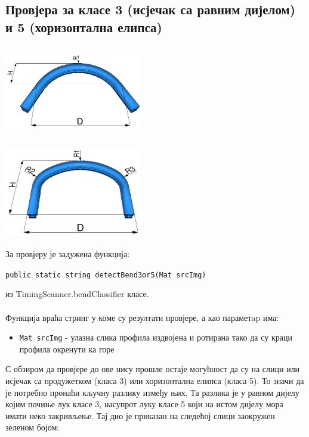 \documentclass[12pt]{article}
\begin{document}
\subsection{Провјера за класе 3 (исјечак са равним дијелом) и 5 (хоризонтална елипса)}
\vspace{0.5cm}
\begin{center}
    \centering 
    \includegraphics[height=4cm, width=6cm]{images/klasa3.jpg}
\end{center}
\vspace{0.5cm}
\vspace{0.5cm}
\begin{center}
    \centering 
    \includegraphics[height=4cm, width=6cm]{images/klasa5.jpg}
\end{center}
\vspace{0.5cm}
За провјеру је задужена функција:
\begin{center}
\texttt{public static string detectBend3or5(Mat srcImg)}
\end{center}
из TimingScanner.bendClassifier класе.\\\\
Функција враћа стринг у коме су резултати провјере, а као параметap има:
\begin{itemize}
    \item \texttt{Mat srcImg} - улазна слика профила издвојена и ротирана тако да су краци профила окренути ка горе 
\end{itemize}
С обзиром да провјере до ове нису прошле остаје могућност да су на слици или исјечак са продужетком (класа 3) или хоризонтална елипса (класа 5). То значи да је потребно пронаћи кључну разлику између њих. Та разлика је у равном дијелу којим почиње лук класе 3, насупрот луку класе 5 који на истом дијелу мора имати неко закривљење. Тај дио је приказан на следећој слици заокружен зеленом бојом:
\end{document}
